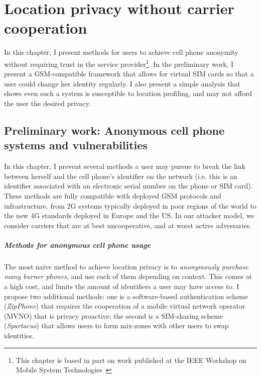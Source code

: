 \chapter{Location privacy without carrier cooperation}
In this chapter, I present methods for users to achieve cell phone anonymity without requiring trust in the service provider\footnote{This chapter is based in part on work published at the IEEE Workshop on Mobile System Technologies~\cite{sung:2014}}. In the preliminary work, I present a GSM-compatible framework that allows for virtual SIM cards so that a user could change her identity regularly. I also present a simple analysis that shows even such a system is susceptible to location profiling, and may not afford the user the desired privacy.

\section{Preliminary work: Anonymous cell phone systems and vulnerabilities}

In this chapter, I prevent several methods a user may pursue to break the link between herself and the cell phone's identifier on the network (i.e. this is an identifier associated with an electronic serial number on the phone or SIM card). These methods are
fully compatible with deployed GSM protocols and infrastructure, from 2G systems typically deployed in poor regions of the world to the new 4G standards deployed in Europe and the US. In our attacker model, we consider carriers that are at best uncooperative, and at worst active adversaries.

\paragraph*{Methods for anonymous cell phone usage}

The most naive method to achieve location privacy is to \textit{anonymously purchase many burner phones}, and use each of them depending on context. 
This comes at a high cost, and limits the amount of identifiers a user may have access to. I propose two additional methods: one is a software-based authentication scheme (\textit{ZipPhone}) that requires the cooperation of a mobile virtual network operator (MVNO) that is privacy proactive; the second is a SIM-sharing scheme (\textit{Spartacus}) that allows users to form mix-zones with other users to swap identities.

